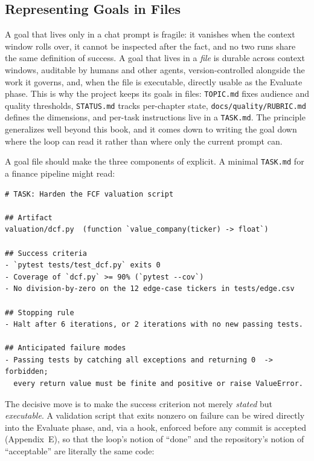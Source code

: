 \subsection{Representing Goals in Files}\label{subsec:goals-in-files}

A goal that lives only in a chat prompt is fragile: it vanishes when the context window rolls over, it cannot be inspected after the fact, and no two runs share the same definition of success. A goal that lives in a \emph{file} is durable across context windows, auditable by humans and other agents, version-controlled alongside the work it governs, and, when the file is executable, directly usable as the Evaluate phase. This is why the project keeps its goals in files: \texttt{TOPIC.md} fixes audience and quality thresholds, \texttt{STATUS.md} tracks per-chapter state, \texttt{docs/quality/RUBRIC.md} defines the dimensions, and per-task instructions live in a \texttt{TASK.md}. The principle generalizes well beyond this book, and it comes down to writing the goal down where the loop can read it rather than where only the current prompt can.

A goal file should make the three components of  explicit. A minimal \texttt{TASK.md} for a finance pipeline might read:

\begin{verbatim}
# TASK: Harden the FCF valuation script

## Artifact
valuation/dcf.py  (function `value_company(ticker) -> float`)

## Success criteria
- `pytest tests/test_dcf.py` exits 0
- Coverage of `dcf.py` >= 90% (`pytest --cov`)
- No division-by-zero on the 12 edge-case tickers in tests/edge.csv

## Stopping rule
- Halt after 6 iterations, or 2 iterations with no new passing tests.

## Anticipated failure modes
- Passing tests by catching all exceptions and returning 0  -> forbidden;
  every return value must be finite and positive or raise ValueError.
\end{verbatim}

The decisive move is to make the success criterion not merely \emph{stated} but \emph{executable}. A validation script that exits nonzero on failure can be wired directly into the Evaluate phase, and, via a hook, enforced before any commit is accepted (Appendix~E), so that the loop's notion of ``done'' and the repository's notion of ``acceptable'' are literally the same code:

